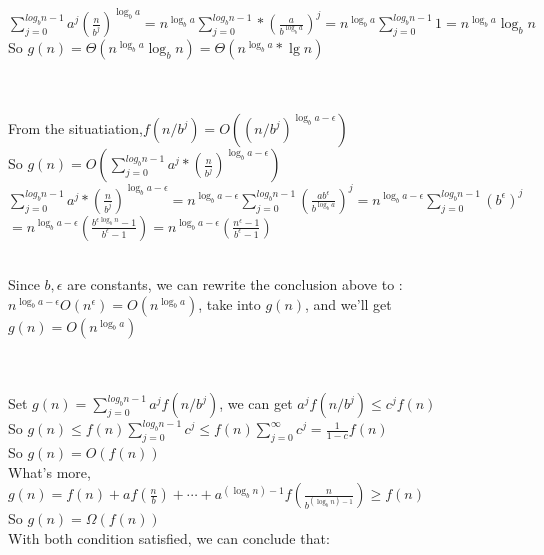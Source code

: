 \documentclass{article}
\begin{document}
\\$\sum_{j=0}^{log_b n-1}a^j(\frac{n}{b^j})^{\log_b a} = n^{\log_b a}\sum_{j=0}^{log_b n-1}*(\frac{a}{b^{\log_b a}})^j = n^{\log_b a}\sum_{j=0}^{log_b n-1}1 = n^{\log_b a}\log_b n$
\\So $g(n) = \Theta (n^{\log_b a}\log_b n) = \Theta (n^{\log_b a}*\lg n)$
\\\\
\\From the situatiation,$f(n/b^j) = O((n/b^j)^{\log_b a-\epsilon})$
\\So $g(n) = O(\sum_{j=0}^{log_b n-1}a^j*(\frac{n}{b^j})^{\log_b a-\epsilon})$
\\$\sum_{j=0}^{log_b n-1}a^j*(\frac{n}{b^j})^{\log_b a-\epsilon} = n^{\log_b a-\epsilon}\sum_{j=0}^{log_b n-1}(\frac{ab^\epsilon}{b^{\log_b a}})^j = n^{\log_b a-\epsilon}\sum_{j=0}^{log_b n-1}(b^\epsilon)^j$
\\$=n^{\log_b a-\epsilon}(\frac{b^{\epsilon \log_b n}-1}{b^\epsilon -1})=n^{\log_b a-\epsilon}(\frac{n^{\epsilon}-1}{b^\epsilon -1})$
\\\\
Since $b, \epsilon $ are constants, we can rewrite the conclusion above to :
\\$n^{\log_b a-\epsilon}O(n^\epsilon) = O(n^{\log_b a}) $, take into $g(n)$, and we'll get $g(n) = O(n^{\log_b a})$
\\\\
\\Set $g(n) = \sum_{j=0}^{log_b n-1}a^jf(n/b^j)$, we can get $a^jf(n/b^j)\leq c^j f(n)$
\\So $g(n) \leq f(n)\sum_{j=0}^{log_b n-1}c^j \leq f(n)\sum_{j=0}^{\infty}c^j= \frac{1}{1-c}f(n)$
\\So $g(n) = O(f(n))$
\\What's more, $g(n) = f(n)+af(\frac{n}{b})+\cdots +a^{(\log_b n) -1}f(\frac{n}{b^{(\log_b n) -1}})\geq f(n)$
\\So $g(n) = \Omega(f(n))$
\\With both condition satisfied, we can conclude that:
\end{document}
